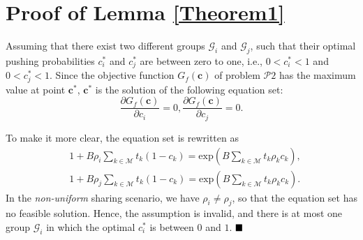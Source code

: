 \documentclass[12pt, draftclsnofoot, onecolumn]{IEEEtran}
\begin{document}
\section{Proof of Lemma \ref{Theorem1}}
\setcounter{equation}{0}
\renewcommand{\theequation}{\thesection.\arabic{equation}}
Assuming that there exist two different groups $\mathcal{G}_i$ and $\mathcal{G}_j$, such that their optimal pushing probabilities $c_i^{\ast}$  and $c_j^{\ast}$ are between zero to one, i.e., $0 < c_i^{\ast} < 1$ and $0 < c_j ^{\ast}< 1$.
Since the objective function $G_{f}(\bm{c})$ of problem $\mathcal{P}2$ has the maximum value at point $\bm{c}^{\ast}$,  $\bm{c}^{\ast}$ is the solution of the following equation set:
\begin{equation}
\frac{\partial G_{f}(\bm{c}) }{\partial c_i} = 0,
\frac{\partial G_{f}(\bm{c}) }{\partial c_j} = 0.
\end{equation}

To make it more clear, the equation set is rewritten as
\begin{eqnarray}
&1+B\rho_i \sum \limits_{k \in \mathcal{M}} t_k (1-c_k) = \textrm{exp}\left({B\sum \limits_{k \in \mathcal{M}}t_k \rho_k c_k }\right), \\
&1+B\rho_j \sum \limits_{k \in \mathcal{M}} t_k (1-c_k) = \textrm{exp}\left({B\sum \limits_{k \in \mathcal{M}}t_k \rho_k c_k }\right).
\end{eqnarray}
In the \textit{non-uniform} sharing scenario, we have $\rho_i \neq \rho_j $, so that the equation set has no feasible solution. Hence, the assumption is invalid, and there is at most one group $\mathcal{G}_i$ in which the optimal $c_i^{\ast}$ is between $0$ and $1$.
$\hfill\blacksquare$


\end{document}
